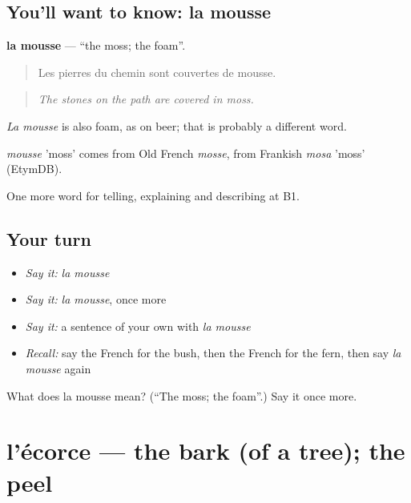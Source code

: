 \subsection*{You'll want to know: la mousse}
\textbf{la mousse} — \textquotedblleft{}the moss; the foam\textquotedblright{}.

\begin{quote}
Les pierres du chemin sont couvertes de mousse.
\end{quote}

\begin{quote}
\emph{The stones on the path are covered in moss.}
\end{quote}

\emph{La mousse} is also foam, as on beer; that is probably a different word.

\begin{cousinweb}
\emph{mousse} 'moss' comes from Old French \emph{mosse}, from Frankish \emph{mosa} 'moss' (EtymDB).
\end{cousinweb}

\begin{grammarlens}[title={What you've built}]
One more word for telling, explaining and describing at B1.
\end{grammarlens}

\subsection*{Your turn}
\begin{itemize}
\raggedright
  \item \emph{Say it:} \emph{la mousse}
  \item \emph{Say it:} \emph{la mousse}, once more
  \item \emph{Say it:} a sentence of your own with \emph{la mousse}
  \item \emph{Recall:} say the French for the bush, then the French for the fern, then say \emph{la mousse} again
\end{itemize}

\begin{tcolorbox}[breakable,colback=teal!4,colframe=teal!35!black,title={Before you move on}]
What does la mousse mean? (\textquotedblleft{}The moss; the foam\textquotedblright{}.) Say it once more.
\end{tcolorbox}
\section[l'écorce]{l'écorce — the bark (of a tree); the peel}

